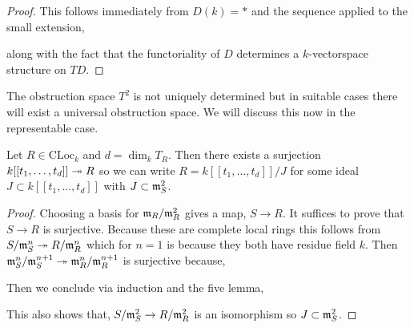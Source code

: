 \documentclass[12pt]{article}
\newcommand{\CLoc}{\mathrm{CLoc}}
\begin{document}
\begin{proof}
This follows immediately from $D(k) = *$ and the sequence applied to the small extension,
\begin{center}
\end{center}
along with the fact that the functoriality of $D$ determines a $k$-vectorspace structure on $TD$. 
\end{proof}

\begin{rmk}
The obstruction space $T^2$ is not uniquely determined but in suitable cases there will exist a universal obstruction space. We will discuss this now in the representable case.
\end{rmk}

\begin{lemma}
Let $R \in \CLoc_k$ and $d = \dim_k T_R$. Then there exists a surjection $k[[t_1, \dots, t_d]] \twoheadrightarrow R$ so we can write $R = k[[t_1, \dots, t_d]] / J$ for some ideal $J \subset k[[t_1, \dots, t_d]]$ with $J \subset \mathfrak{m}_S^2$.
\end{lemma}

\begin{proof}
Choosing a basis for $\mathfrak{m}_R / \mathfrak{m}_R^2$ gives a map, $S \to R$. It suffices to prove that $S \to R$ is surjective. Because these are complete local rings this follows from $S / \mathfrak{m}_S^n \twoheadrightarrow R / \mathfrak{m}_R^n$ which for $n = 1$ is because they both have residue field $k$. Then $\mathfrak{m}^n_S / \mathfrak{m}^{n+1}_S \twoheadrightarrow \mathfrak{m}_R^n / \mathfrak{m}_R^{n+1}$ is surjective because,
\begin{center}
\end{center}
Then we conclude via induction and the five lemma,
\begin{center}
\end{center}
This also shows that, $S / \mathfrak{m}_S^2 \to R / \mathfrak{m}_R^2$ is an isomorphism so $J \subset \mathfrak{m}_S^2$. 
\end{proof}
\end{document}
